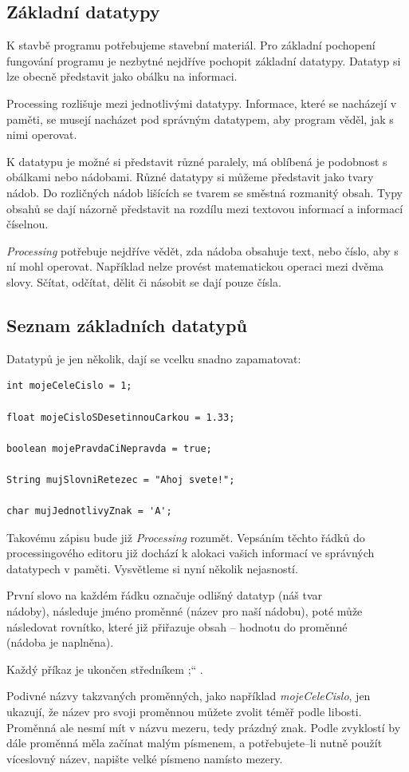 \documentclass[10pt,twoside=true,open=right,cleardoublepage=empty,chapterprefix=true]{scrbook}
\renewcommand\uv[1]{\quotedblbase #1\textquotedblleft}%
\newcommand{\pododdil}[1]{\subsection{#1}\index{#1}\label{#1}}
\begin{document}
\pododdil{Základní datatypy}

K stavbě programu potřebujeme stavební materiál. Pro základní pochopení fungování programu je nezbytné nejdříve pochopit základní datatypy. Datatyp si lze obecně představit jako obálku na informaci.

Processing rozlišuje mezi jednotlivými datatypy. Informace, které se nacházejí v paměti, se musejí nacházet pod správným datatypem, aby program věděl, jak s nimi operovat.

K datatypu je možné si představit různé paralely, má oblíbená je podobnost s obálkami nebo nádobami. Různé datatypy si můžeme představit jako tvary nádob. Do rozličných nádob lišících se tvarem se směstná rozmanitý obsah. Typy obsahů se dají názorně představit na rozdílu mezi textovou informací a informací číselnou.

{\em Processing} potřebuje nejdříve vědět, zda nádoba obsahuje text, nebo číslo, aby s ní mohl operovat. Například nelze provést matematickou operaci mezi dvěma slovy. Sčítat, odčítat, dělit či násobit se dají pouze čísla.


\pododdil{Seznam základních datatypů}
Datatypů je jen několik, dají se vcelku snadno zapamatovat:

\begin{lstlisting}
int mojeCeleCislo = 1;

float mojeCisloSDesetinnouCarkou = 1.33;

boolean mojePravdaCiNepravda = true;

String mujSlovniRetezec = "Ahoj svete!";

char mujJednotlivyZnak = 'A';

\end{lstlisting}

Takovému zápisu bude již {\em Processing} rozumět. Vepsáním těchto řádků do processingového editoru již dochází k alokaci vašich informací ve správných datatypech v paměti. Vysvětleme si nyní několik nejasností.

První slovo na každém řádku označuje odlišný datatyp (náš tvar \\nádoby), následuje jméno proměnné (název pro naší nádobu), poté může \\následovat rovnítko, které již přiřazuje obsah -- hodnotu do proměnné \\(nádoba je naplněna).

Každý příkaz je ukončen středníkem \uv{;} .

Podivné názvy takzvaných proměnných, jako například {\em mojeCeleCislo}, jen ukazují, že název pro svoji proměnnou můžete zvolit téměř podle libosti. Proměnná ale nesmí mít v názvu mezeru, tedy prázdný znak. Podle zvyklostí by dále proměnná měla začínat malým písmenem, a potřebujete--li nutně použít víceslovný název, napište velké písmeno namísto mezery.
\end{document}
